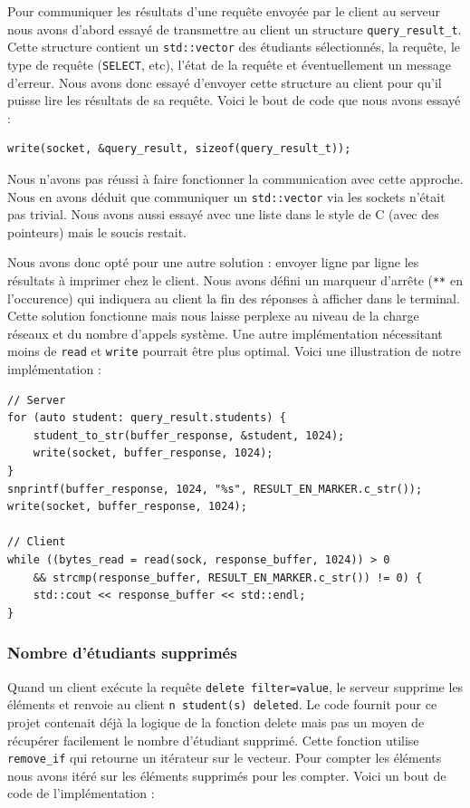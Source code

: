\documentclass[utf8]{article}
\begin{document}
Pour communiquer les résultats d'une requête envoyée par le client au serveur nous avons d'abord essayé de transmettre au client un structure \texttt{query\_result\_t}. Cette structure contient un \texttt{std::vector} des étudiants sélectionnés, la requête, le type de requête (\texttt{SELECT}, etc), l'état de la requête et éventuellement un message d'erreur. Nous avons donc essayé d'envoyer cette structure au client pour qu'il puisse lire les résultats de sa requête. Voici le bout de code que nous avons essayé :
\begin{lstlisting}
write(socket, &query_result, sizeof(query_result_t));
\end{lstlisting}
	
	Nous n'avons pas réussi à faire fonctionner la communication avec cette approche. Nous en avons déduit que communiquer un \texttt{std::vector} via les sockets n'était pas trivial. Nous avons aussi essayé avec une liste dans le style de C (avec des pointeurs) mais le soucis restait.
	
	Nous avons donc opté pour une autre solution : envoyer ligne par ligne les résultats à imprimer chez le client. Nous avons défini un marqueur d'arrête (\texttt{**} en l'occurence) qui indiquera au client la fin des réponses à afficher dans le terminal. Cette solution fonctionne mais nous laisse perplexe au niveau de la charge réseaux et du nombre d'appels système. Une autre implémentation nécessitant moins de \texttt{read} et \texttt{write} pourrait être plus optimal. Voici une illustration de notre implémentation :

\begin{lstlisting}
// Server
for (auto student: query_result.students) {
	student_to_str(buffer_response, &student, 1024);
	write(socket, buffer_response, 1024);
}
snprintf(buffer_response, 1024, "%s", RESULT_EN_MARKER.c_str());
write(socket, buffer_response, 1024);

// Client 
while ((bytes_read = read(sock, response_buffer, 1024)) > 0
	&& strcmp(response_buffer, RESULT_EN_MARKER.c_str()) != 0) {
	std::cout << response_buffer << std::endl;
}
\end{lstlisting}

\subsubsection{Nombre d'étudiants supprimés}

Quand un client exécute la requête \texttt{delete filter=value}, le serveur supprime les éléments et renvoie au client \texttt{n student(s) deleted}. Le code fournit pour ce projet contenait déjà la logique de la fonction delete mais pas un moyen de récupérer facilement le nombre d'étudiant supprimé. Cette fonction utilise \texttt{remove\_if} qui retourne un itérateur sur le vecteur. Pour compter les éléments nous avons itéré sur les éléments supprimés pour les compter. Voici un bout de code de l'implémentation :
\end{document}
